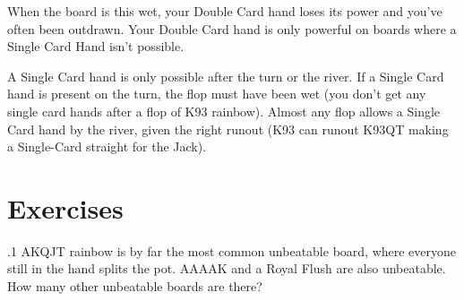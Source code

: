 When the board is this wet, your Double Card hand loses its power and
you've often been outdrawn. Your Double Card hand is only powerful on
boards where a Single Card Hand isn't possible.

A Single Card hand is only possible after the turn or the river. If a
Single Card hand is present on the turn, the flop must have been wet
(you don't get any single card hands after a flop of K93
rainbow). Almost any flop allows a Single Card hand by the river,
given the right runout (K93 can runout K93QT making a Single-Card
straight for the Jack).

\section{Exercises}

.1 AKQJT rainbow is by far the most common unbeatable
board, where everyone still in the hand splits the pot. AAAAK and a
Royal Flush are also unbeatable. How many other unbeatable boards are
there?
